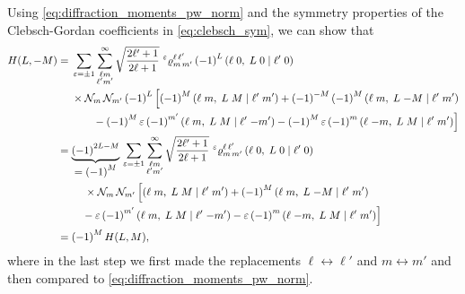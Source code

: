 Using \cref{eq:diffraction_moments_pw_norm} and the symmetry
properties of the Clebsch-Gordan coefficients in
\cref{eq:clebsch_sym}, we can show that
\begin{align}
  H(L, -M)
  ={}& \begin{multlined}[t][0.8\textwidth]
    \sum_{\refl = \pm 1} \sum_{\substack{\ell m \\ \ell' m'}}^\infty
    \sqrt{\frac{2 \ell' + 1}{2 \ell + 1}}\,
    \prescript{\refl}{}{\varrho}^{\ell\, \ell'}_{m\, m'}\, {(-1)}^L\, \clebsch{\ell}{0}{L}{0}{\ell'}{0} \\
    \times \mathcal{N}_m\, \mathcal{N}_{m'}\, {(-1)}^L\, \Big[
      {(-1)}^M\, \clebsch{\ell}{m}{L}{M}{\ell'}{m'}
      + {(-1)}^{-M}\, {(-1)}^M\, \clebsch{\ell}{m}{L}{-M}{\ell'}{m'} \\
      - {(-1)}^M\, \refl\, {(-1)}^{m'}\, \clebsch{\ell}{m}{L}{M}{\ell'}{-m'}
      - {(-1)}^M\, \refl\, {(-1)}^m\, \clebsch{\ell}{-m}{L}{M}{\ell'}{m'} \Big]
  \end{multlined} \notag
  \\
  ={}& \begin{multlined}[t][0.8\textwidth]
    \dUnderbrace{{(-1)}^{2 L - M}}{= {(-1)}^M}\, \sum_{\refl = \pm 1} \sum_{\substack{\ell m \\ \ell' m'}}^\infty
    \sqrt{\frac{2 \ell' + 1}{2 \ell + 1}}\,
    \prescript{\refl}{}{\varrho}^{\ell\, \ell'}_{m\, m'}\, \clebsch{\ell}{0}{L}{0}{\ell'}{0} \\
    \times \mathcal{N}_m\, \mathcal{N}_{m'}\, \Big[
      \clebsch{\ell}{m}{L}{M}{\ell'}{m'}
      + {(-1)}^{M}\, \clebsch{\ell}{m}{L}{-M}{\ell'}{m'} \\
      - \refl\, {(-1)}^{m'}\, \clebsch{\ell}{m}{L}{M}{\ell'}{-m'}
      - \refl\, {(-1)}^m\, \clebsch{\ell}{-m}{L}{M}{\ell'}{m'} \Big]
  \end{multlined} \notag
  \\
  \label{eq:diffraction_moment_sym_2}
  ={}& {(-1)}^M\, H(L, M),
\end{align}
where in the last step we first made the replacements $\ell
\leftrightarrow \ell'$ and $m \leftrightarrow m'$ and then compared to
\cref{eq:diffraction_moments_pw_norm}.

